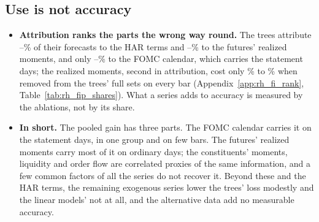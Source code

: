 \subsection{Use is not accuracy}
\label{sec:rh_fi_use}
\begin{itemize}
\item \textbf{Attribution ranks the parts the wrong way round.} The trees attribute
  \rhfipHarMin--\rhfipHarMax\% of their forecasts to the HAR terms and \rhfipMomMin--\rhfipMomMax\% to the futures'
  realized moments, and only \rhfipFomcBucketMin--\rhfipFomcBucketMax\% to the FOMC calendar, which carries the
  statement days; the realized moments, second in attribution, cost only \rhabLgbmLoRmAllPct\% to
  \rhabXgbLoRmAllPct\% when removed from the trees' full sets on every bar (Appendix~\ref{app:rh_fi_rank},
  Table~\ref{tab:rh_fip_shares}). What a series adds to accuracy is measured by the ablations, not by its share.
\item \textbf{In short.} The pooled gain has three parts. The FOMC calendar carries it on the statement days, in one
  group and on few bars. The futures' realized moments carry most of it on ordinary days; the constituents' moments,
  liquidity and order flow are correlated proxies of the same information, and a few common factors of all the series
  do not recover it. Beyond these and the HAR terms, the remaining exogenous series lower the trees' loss modestly and
  the linear models' not at all, and the alternative data add no measurable accuracy.
\end{itemize}
